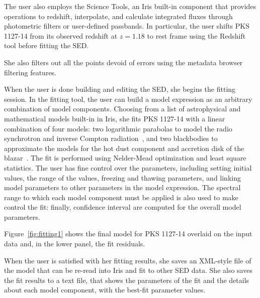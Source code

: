\documentclass[final,5p,authoryear]{elsarticle}
\begin{document}
The user also employs the Science Tools, an Iris built-in component that
provides operations to redshift, interpolate, and calculate integrated fluxes
through photometric filters or user-defined passbands. In particular, the user
shifts PKS 1127-14 from its observed redshift at $z=1.18$ to rest frame using
the Redshift tool before fitting the SED.

She also filters out all the points devoid of errors using the metadata browser
filtering features.

When the user is done building and editing the SED, she begins the fitting
session. In the fitting tool, the user can build a model expression as an
arbitrary combination of model components. Choosing from a list of astrophysical
and mathematical models built-in in Iris, she fits PKS 1127-14 with a linear
combination of four models: two logarithmic parabolas to model the radio
synchrotron and inverse Compton radiation~\citep{2006A&A...448..861M,2009A&A...501..879T}, and two blackbodies to approximate
the models for the hot dust component and accretion disk of the blazar~\citep{2002ApJ...575..667D}. The fit
is performed using Nelder-Mead optimization and least square statistics. The user
has fine control over the parameters, including setting initial values, the
range of the values, freezing and thawing parameters, and linking model
parameters to other parameters in the model expression. The spectral range to
which each model component must be applied is also used to make control the fit:
finally, confidence interval are computed for the overall model parameters.

Figure~\ref{fig:fitting1} shows the final model for PKS 1127-14 overlaid on the
input data and, in the lower panel, the fit residuals.

When the user is satisfied with her fitting results, she saves an XML-style file
of the model that can be re-read into Iris and fit to other SED data. She also
saves the fit results to a text file, that shows the parameters of the fit and
the details about each model component, with the best-fit parameter values.



\end{document}
